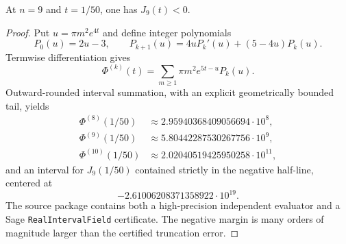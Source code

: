 
\begin{theorem}\label{thm:theta}
At $n=9$ and $t=1/50$, one has $J_9(t)<0$.
\end{theorem}
\begin{proof}
Put $u=\pi m^2e^{4t}$ and define integer polynomials
\[
P_0(u)=2u-3,\qquad P_{k+1}(u)=4uP_k'(u)+(5-4u)P_k(u).
\]
Termwise differentiation gives
\[
\Phi^{(k)}(t)=\sum_{m\ge1}\pi m^2e^{5t-u}P_k(u).
\]
Outward-rounded interval summation, with an explicit geometrically bounded tail, yields
\begin{align*}
\Phi^{(8)}(1/50)&\approx 2.95940368409056694\cdot10^8,\\
\Phi^{(9)}(1/50)&\approx 5.80442287530267756\cdot10^9,\\
\Phi^{(10)}(1/50)&\approx 2.02040519425950258\cdot10^{11},
\end{align*}
and an interval for $J_9(1/50)$ contained strictly in the negative half-line, centered at
\[
-2.61006208371358922\cdot10^{19}.
\]
The source package contains both a high-precision independent evaluator and a Sage \texttt{RealIntervalField} certificate.  The negative margin is many orders of magnitude larger than the certified truncation error.
\end{proof}
